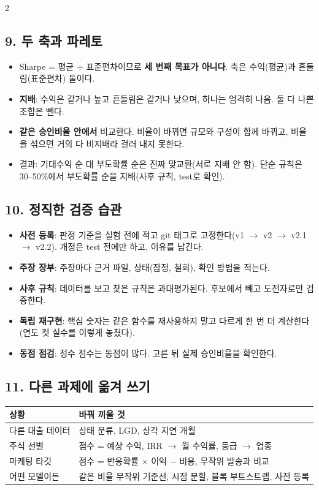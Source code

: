 \begin{multicols}{2}
\subsection*{9. 두 축과 파레토}
\begin{itemize}
\item Sharpe = 평균 \ensuremath{\div} 표준편차이므로 \textbf{세 번째 목표가 아니다}. 축은 수익(평균)과 흔들림(표준편차) 둘이다.
\item \textbf{지배}: 수익은 같거나 높고 흔들림은 같거나 낮으며, 하나는 엄격히 나음. 둘 다 나쁜 조합은 뺀다.
\item \textbf{같은 승인비율 안에서} 비교한다. 비율이 바뀌면 규모와 구성이 함께 바뀌고, 비율을 섞으면 거의 다 비지배라 걸러 내지 못한다.
\item 결과: 기대수익 순 대 부도확률 순은 진짜 맞교환(서로 지배 안 함). 단순 규칙은 30--50\%에서 부도확률 순을 지배(사후 규칙, test로 확인).
\end{itemize}

\subsection*{10. 정직한 검증 습관}
\begin{itemize}
\item \textbf{사전 등록}: 판정 기준을 실험 전에 적고 git 태그로 고정한다(v1 \ensuremath{\to} v2 \ensuremath{\to} v2.1 \ensuremath{\to} v2.2). 개정은 test 전에만 하고, 이유를 남긴다.
\item \textbf{주장 장부}: 주장마다 근거 파일, 상태(잠정, 철회), 확인 방법을 적는다.
\item \textbf{사후 규칙}: 데이터를 보고 찾은 규칙은 과대평가된다. 후보에서 빼고 도전자로만 검증한다.
\item \textbf{독립 재구현}: 핵심 숫자는 같은 함수를 재사용하지 말고 다르게 한 번 더 계산한다(연도 컷 실수를 이렇게 놓쳤다).
\item \textbf{동점 점검}: 정수 점수는 동점이 많다. 고른 뒤 실제 승인비율을 확인한다.
\end{itemize}

\subsection*{11. 다른 과제에 옮겨 쓰기}
\begin{tabularx}{\linewidth}{@{}p{22mm}X@{}}\toprule
상황 & 바꿔 끼울 것\\\midrule
다른 대출 데이터 & 상태 분류, LGD, 상각 지연 개월\\
주식 선별 & 점수 = 예상 수익, IRR \ensuremath{\to} 월 수익률, 등급 \ensuremath{\to} 업종\\
마케팅 타깃 & 점수 = 반응확률 \ensuremath{\times} 이익 $-$ 비용, 무작위 발송과 비교\\
어떤 모델이든 & 같은 비율 무작위 기준선, 시점 분할, 블록 부트스트랩, 사전 등록\\\bottomrule
\end{tabularx}
\end{multicols}

\endgroup
